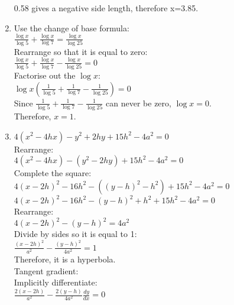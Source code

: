 \documentclass[../main.tex]{subfiles}
\begin{document}
\begin{enumerate}
    0.58 gives a negative side length, therefore x=3.85.\\
    
    \item 
    Use the change of base formula:\\
    \(\frac{\log{x}}{\log{5}}+\frac{\log{x}}{\log{7}}=\frac{\log{x}}{\log{25}}\)\\

    Rearrange so that it is equal to zero:\\
    \(\frac{\log{x}}{\log{5}}+\frac{\log{x}}{\log{7}}-\frac{\log{x}}{\log{25}}=0\)\\

    Factorise out the \(\log{x}\):\\
    \(\log{x}(\frac{1}{\log{5}}+\frac{1}{\log{7}}-\frac{1}{\log{25}})=0\)\\

    Since \(\frac{1}{\log{5}}+\frac{1}{\log{7}}-\frac{1}{\log{25}}\) can never be zero, \(\log{x}=0\).\\

    Therefore, \(x=1\).\\

    \item 
    \(4(x^2-4hx)-y^2+2hy+15h^2-4a^2=0\)\\

    Rearrange:\\
    \(4(x^2-4hx)-(y^2-2hy)+15h^2-4a^2=0\)\\

    Complete the square:\\
    \(4(x-2h)^2-16h^2-((y-h)^2-h^2)+15h^2-4a^2=0 \)\\
    \(4(x-2h)^2-16h^2-(y-h)^2+h^2+15h^2-4a^2=0 \)\\

    Rearrange:\\
    \(4(x-2h)^2-(y-h)^2=4a^2\)\\

    Divide by sides so it is equal to 1:\\
    \(\frac{(x-2h)^2}{a^2}-\frac{(y-h)^2}{4a^2}=1\)\\
    Therefore, it is a hyperbola.\\

    Tangent gradient:\\
    Implicitly differentiate:\\
    \(\frac{2(x-2h)}{a^2}-\frac{2(y-h)}{4a^2}\frac{dy}{dx}=0\)\\


\end{enumerate}
\end{document}

